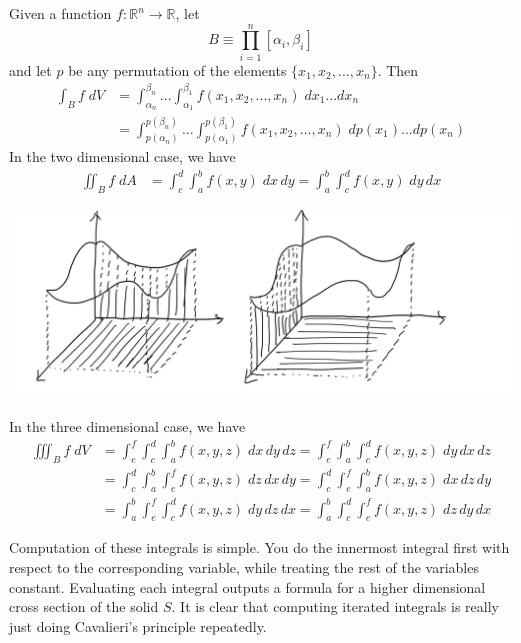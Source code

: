   \begin{theorem}
    Given a function $f: \mathbb{R}^n \longrightarrow \mathbb{R}$, let 
    \[B \equiv \prod_{i=1}^n [\alpha_i, \beta_i]\]
    and let 
    $p$ be any permutation of the elements $\{x_1, x_2, ..., x_n\}$. Then 
    \begin{align*}
        \int_B f \; d V & = \int_{\alpha_n}^{\beta_n} ... \int_{\alpha_1}^{\beta_1} f(x_1,x_2,...,x_n) \; d x_1 ... d x_n \\
        & = \int_{p(\alpha_n)}^{p(\beta_n)} ... \int_{p(\alpha_1)}^{p(\beta_1)} f(x_1,x_2, ..., x_n) \; d p(x_1) ... d p(x_n) 
    \end{align*}
    In the two dimensional case, we have
    \begin{align*}
        \iint_B f \; d A & = \int_c^d \int_a^b f(x, y) \; d x \, d y = \int_a^b \int_c^d f(x, y) \; d y \, d x 
    \end{align*}
    \begin{center}
        \includegraphics[scale=0.27]{img/Fubini_Theorem.PNG}
    \end{center}
    In the three dimensional case, we have
    \begin{align*}
        \iiint_B f \; d V & 
        = \int_e^f \int_c^d \int_a^b f(x, y, z) \; d x \, d y \, d z = \int_e^f \int_a^b \int_c^d f(x, y, z) \; d y \, d x \, d z \\
        & = \int_c^d \int_a^b \int_e^f f(x, y, z) \; d z \, d x \, d y = \int_c^d \int_e^f \int_a^b f(x, y, z) \; d x \, d z \, d y \\
        & = \int_a^b \int_e^f \int_c^d f(x, y, z) \; d y \, d z \, d x = \int_a^b \int_c^d \int_e^f f(x, y, z) \; d z \, d y \, d x 
    \end{align*}
  \end{theorem}

  Computation of these integrals is simple. You do the innermost integral first with respect to the corresponding variable, while treating the rest of the variables constant. Evaluating each integral outputs a formula for a higher dimensional cross section of the solid $S$. It is clear that computing iterated integrals is really just doing Cavalieri's principle repeatedly. 

